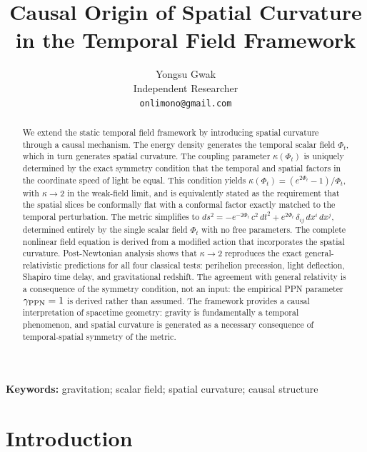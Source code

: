 \documentclass[12pt]{article}
\title{Causal Origin of Spatial Curvature in the Temporal Field Framework}
\author{Yongsu Gwak\\[6pt]\normalsize Independent Researcher\\[2pt]\normalsize\texttt{onlimono@gmail.com}}
\date{}
\begin{document}
\maketitle

\begin{abstract}
We extend the static temporal field framework by introducing spatial curvature through a causal mechanism. The energy density generates the temporal scalar field $\Phi_t$, which in turn generates spatial curvature. The coupling parameter $\kappa(\Phi_t)$ is uniquely determined by the exact symmetry condition that the temporal and spatial factors in the coordinate speed of light be equal. This condition yields $\kappa(\Phi_t) = (e^{2\Phi_t}-1)/\Phi_t$, with $\kappa \to 2$ in the weak-field limit, and is equivalently stated as the requirement that the spatial slices be conformally flat with a conformal factor exactly matched to the temporal perturbation. The metric simplifies to $ds^2 = -e^{-2\Phi_t}\,c^2\,dt^2 + e^{2\Phi_t}\,\delta_{ij}\,dx^i\,dx^j$, determined entirely by the single scalar field $\Phi_t$ with no free parameters. The complete nonlinear field equation is derived from a modified action that incorporates the spatial curvature. Post-Newtonian analysis shows that $\kappa \to 2$ reproduces the exact general-relativistic predictions for all four classical tests: perihelion precession, light deflection, Shapiro time delay, and gravitational redshift. The agreement with general relativity is a consequence of the symmetry condition, not an input: the empirical PPN parameter $\gamma_{\rm PPN} = 1$ is derived rather than assumed. The framework provides a causal interpretation of spacetime geometry: gravity is fundamentally a temporal phenomenon, and spatial curvature is generated as a necessary consequence of temporal-spatial symmetry of the metric.
\end{abstract}

\noindent\textbf{Keywords:} gravitation; scalar field; spatial curvature; causal structure


\section{Introduction}
\label{sec:intro}
\end{document}
